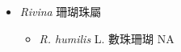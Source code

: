
  \begin{itemize}
 \item[] \textit{Rivina} 珊瑚珠屬
                                
  \begin{itemize}
        \item[] \textit{R. humilis} L.  數珠珊瑚   NA
  \end{itemize}
  \end{itemize}
